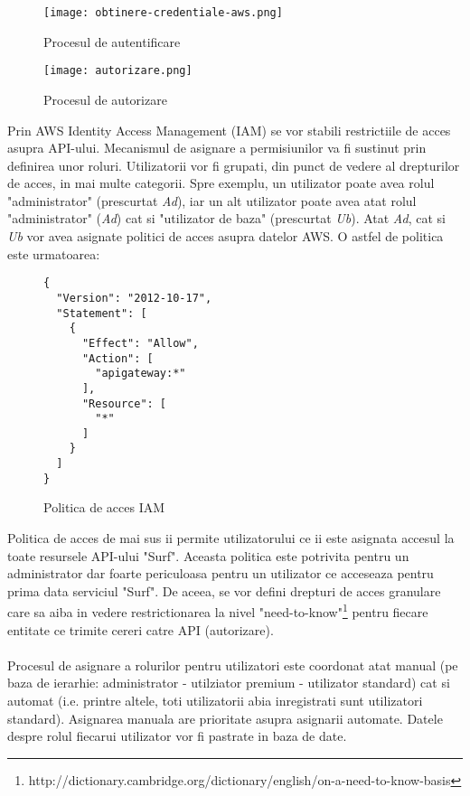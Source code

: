 \begin{figure}[ht]
\begin{center}
	\texttt{[image: obtinere-credentiale-aws.png]}
	\caption{Procesul de autentificare \cite{diagram-icons-sources}}\par\medskip
	\vspace{10mm}
	\texttt{[image: autorizare.png]}
	\caption{Procesul de autorizare \cite{diagram-icons-sources}}\par\medskip

\end{center}
\end{figure}

\noindent
Prin AWS Identity Access Management (IAM) se vor stabili restrictiile de acces asupra API-ului. Mecanismul de asignare a permisiunilor va fi sustinut prin definirea unor roluri. Utilizatorii vor fi grupati, din punct de vedere al drepturilor de acces, in mai multe categorii. Spre exemplu, un utilizator poate avea rolul "administrator" (prescurtat \emph{Ad}), iar un alt utilizator poate avea atat rolul "administrator" (\emph{Ad}) cat si "utilizator de baza" (prescurtat \emph{Ub}). Atat \emph{Ad}, cat si \emph{Ub} vor avea asignate politici de acces asupra datelor AWS. O astfel de politica este urmatoarea:
\newpage

\begin{figure}[ht]
\begin{verbatim}
{
  "Version": "2012-10-17",
  "Statement": [
    {
      "Effect": "Allow",
      "Action": [
        "apigateway:*"
      ],
      "Resource": [
        "*"
      ]
    }
  ]
}
\end{verbatim}
\begin{center}
	\caption{Politica de acces IAM}\par\medskip
\end{center}
\end{figure}

\noindent
Politica de acces de mai sus ii permite utilizatorului ce ii este asignata accesul la toate resursele API-ului "Surf". Aceasta politica este potrivita pentru un administrator dar foarte periculoasa pentru un utilizator ce acceseaza pentru prima data serviciul "Surf". De aceea, se vor defini drepturi de acces granulare care sa aiba in vedere restrictionarea la nivel "need-to-know"\footnote{http://dictionary.cambridge.org/dictionary/english/on-a-need-to-know-basis} pentru fiecare entitate ce trimite cereri catre API (autorizare).
\\
\\
Procesul de asignare a rolurilor pentru utilizatori este coordonat atat manual (pe baza de ierarhie: administrator - utilziator premium - utilizator standard) cat si automat (i.e. printre altele, toti utilizatorii abia inregistrati sunt utilizatori standard). Asignarea manuala are prioritate asupra asignarii automate. Datele despre rolul fiecarui utilizator vor fi pastrate in baza de date.
\\


